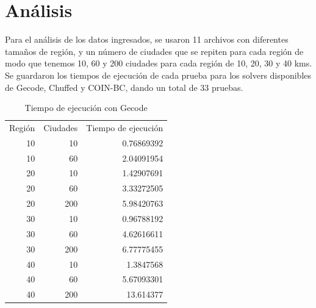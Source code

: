 \documentclass{article}
\begin{document}
\section{Análisis}
Para el análisis de los datos ingresados, se usaron 11 archivos con diferentes tamaños de región, y un número de ciudades que se repiten para cada región
de modo que tenemos 10, 60 y 200 ciudades para cada región de 10, 20, 30 y 40 kms.
Se guardaron los tiempos de ejecución de cada prueba para los solvers disponibles de Gecode, Chuffed y COIN-BC, dando un total de 33 pruebas.

\pagebreak

\begin{table}[h]
    \centering
    \caption{Tiempo de ejecución con Gecode}
      \begin{tabular}{rrr}
      \multicolumn{1}{l}{Región} & \multicolumn{1}{l}{Ciudades} & \multicolumn{1}{l}{Tiempo de ejecución} \\
      10    & 10    & 0.76869392 \\
      10    & 60    & 2.04091954 \\
      20    & 10    & 1.42907691 \\
      20    & 60    & 3.33272505 \\
      20    & 200   & 5.98420763 \\
      30    & 10    & 0.96788192 \\
      30    & 60    & 4.62616611 \\
      30    & 200   & 6.77775455 \\
      40    & 10    & 1.3847568 \\
      40    & 60    & 5.67093301 \\
      40    & 200   & 13.614377 \\
      \end{tabular}%
    \label{tab:addlabel}%
\end{table}%
\end{document}
